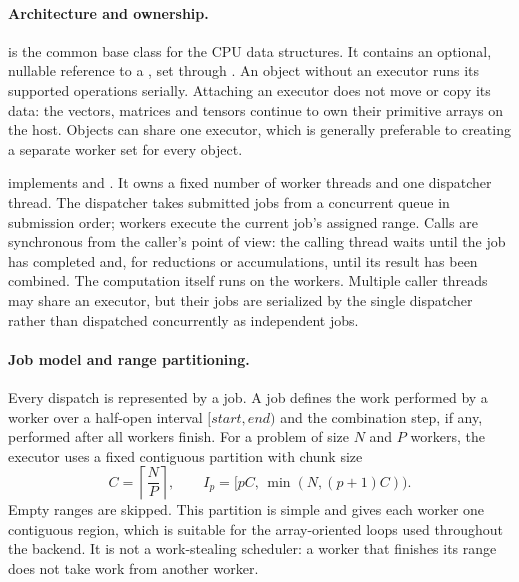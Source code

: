 \documentclass[main.tex]{subfiles}
\begin{document}
    \paragraph{Architecture and ownership.}
     is the common base class for the CPU data structures. It contains an optional, nullable reference to a , set through . An object without an executor runs its supported operations serially. Attaching an executor does not move or copy its data: the vectors, matrices and tensors continue to own their primitive arrays on the host. Objects can share one executor, which is generally preferable to creating a separate worker set for every object.

     implements  and . It owns a fixed number of worker threads and one dispatcher thread. The dispatcher takes submitted jobs from a concurrent queue in submission order; workers execute the current job's assigned range. Calls are synchronous from the caller's point of view: the calling thread waits until the job has completed and, for reductions or accumulations, until its result has been combined. The computation itself runs on the workers. Multiple caller threads may share an executor, but their jobs are serialized by the single dispatcher rather than dispatched concurrently as independent jobs.

    \paragraph{Job model and range partitioning.}
    Every dispatch is represented by a job. A job defines the work performed by a worker over a half-open interval $[\mathit{start},\mathit{end})$ and the combination step, if any, performed after all workers finish. For a problem of size $N$ and $P$ workers, the executor uses a fixed contiguous partition with chunk size
    \begin{equation}
        C = \left\lceil \frac{N}{P} \right\rceil,
        \qquad
        I_p = [pC,\,\min(N,(p+1)C)).
    \end{equation}
    Empty ranges are skipped. This partition is simple and gives each worker one contiguous region, which is suitable for the array-oriented loops used throughout the backend. It is not a work-stealing scheduler: a worker that finishes its range does not take work from another worker.
\end{document}
